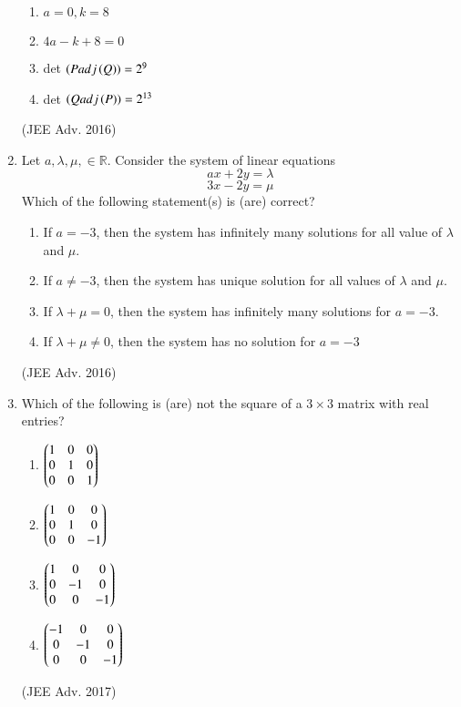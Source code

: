 \documentclass[journal]{IEEEtran}
\begin{document}
\begin{enumerate}
					\begin{enumerate}
						\item $a=0, k=8$
						\item $4a-k+8=0$
						\item det $\left(P adj \left(Q\right)\right) = 2^9$
						\item det $\left(Q adj \left(P\right)\right) = 2^{13}$
					\end{enumerate}
					\hfill (JEE Adv. 2016)
				\item
					Let $a, \lambda, \mu, \in \mathbb{R}$. Consider the system of linear equations $$ax+2y=\lambda$$ $$3x-2y=\mu$$ Which of the following statement(s) is (are) correct?
					\begin{enumerate}
						\item If $a=-3$, then the system has infinitely many solutions for all value of $\lambda$ and $\mu$.
						\item If $a \neq -3$, then the system has unique solution for all values of $\lambda$ and $\mu$.
						\item If $\lambda + \mu = 0$, then the system has infinitely many solutions for $a = -3$.
						\item If $\lambda + \mu \neq 0$, then the system has no solution for $a = -3$
					\end{enumerate}
					\hfill (JEE Adv. 2016)
				\item 
					Which of the following is (are) not the square of a $3 \times 3$ matrix with real entries?
						\begin{enumerate}
							\itemsep0.4em
							\item 
								$\begin{pmatrix}
									1&0&0\\
									0&1&0\\
									0&0&1
								\end{pmatrix}$\\
							\item 
								$\begin{pmatrix}
									1&0&0\\
									0&1&0\\
									0&0&-1
								\end{pmatrix}$\\
							\item 
								$\begin{pmatrix}
									1&0&0\\
									0&-1&0\\
									0&0&-1
								\end{pmatrix}$\\
							\item 
								$\begin{pmatrix}
									-1&0&0\\
									0&-1&0\\
									0&0&-1
								\end{pmatrix}$\\
						\end{enumerate}
						\hfill (JEE Adv. 2017)	
			\end{enumerate}


  
\end{document}
